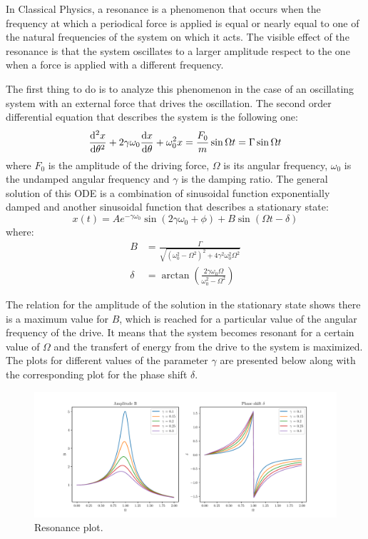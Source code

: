 In Classical Physics, a resonance is a phenomenon that occurs when the frequency at which a periodical force is applied is equal or nearly equal to one of the natural frequencies of the system on which it acts. The visible effect of the resonance is that the system oscillates to a larger amplitude respect to the one when a force is applied with a different frequency.

The first thing to do is to analyze this phenomenon in the case of an oscillating system with an external force that drives the oscillation. The second order differential equation that describes the system is the following one:
\begin{equation}
	\displaystyle \frac{\mathrm{d}^{2} x}{\mathrm{d} {\theta}^{2}} + 2 \gamma \omega_{0} \displaystyle \frac{\mathrm{d} x}{\mathrm{d} \theta} + \omega_{0}^2 x = \frac{F_0}{m} \sin{\Omega t} = \Gamma \sin{\Omega t}
\end{equation}
where $F_{0}$ is the amplitude of the driving force, $\Omega$ is its angular frequency, $\omega_{0}$ is the undamped angular frequency and $\gamma$ is the damping ratio. The general solution of this ODE is a combination of sinusoidal function exponentially damped and another sinusoidal function that describes a stationary state:
\begin{equation}
	x(t) = A e^{-\gamma \omega_{0}} \sin{(2\gamma \omega_{0} + \phi)} + B \sin{(\Omega t - \delta)}
\end{equation}
where:
\begin{align}
	B &= \frac{\Gamma}{\sqrt{(\omega_{0}^2 - \Omega^2)^2 + 4 \gamma^2 \omega_{0}^2 \Omega^2}}	\\
	\delta &= \arctan{\left( \frac{2 \gamma \omega_{0} \Omega}{\omega_{0}^2 - \Omega^2} \right)}
\end{align}

The relation for the amplitude of the solution in the stationary state shows there is a maximum value for $B$, which is reached for a particular value of the angular frequency of the drive. It means that the system becomes resonant for a certain value of $\Omega$ and the transfert of energy from the drive to the system is maximized. The plots for different values of the parameter $\gamma$ are presented below along with the corresponding plot for the phase shift $\delta$.

\begin{figure}[H]
	\begin{center}
		\includegraphics[width=1.0\textwidth]{Python/LHC/resonance.pdf}
		\caption{Resonance plot.}
		\label{fig:RESONANCE_PLOT}
	\end{center}
\end{figure}

